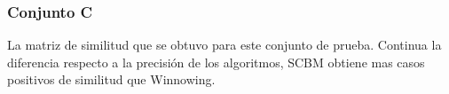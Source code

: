 \subsubsection{Conjunto C}
La matriz de similitud que se obtuvo para este conjunto de prueba. Continua la diferencia respecto a la precisión de los algoritmos, SCBM obtiene mas casos positivos de similitud que Winnowing.
\begin{figure}[!h]
\centering
{}
\hspace{-1.5cm}
\hspace{-1.5cm}
\end{figure}
